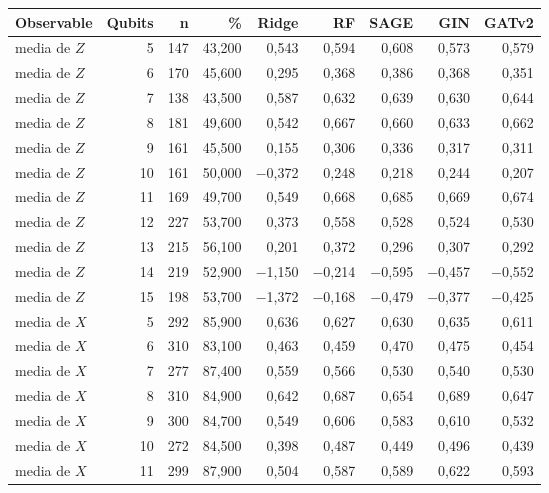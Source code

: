 \begin{table}[htbp]
    \centering
    {\footnotesize
    \begin{tabular}{@{}lrrrrrrrr@{}}
        \toprule
        \textbf{Observable} & \textbf{Qubits} & \textbf{n} & \textbf{\%} & \textbf{Ridge} & \textbf{RF} & \textbf{SAGE} & \textbf{GIN} & \textbf{GATv2} \\
        \midrule
        media de $Z$ & 5 & 147 & 43,200 & 0,543 & 0,594 & 0,608 & 0,573 & 0,579 \\
        media de $Z$ & 6 & 170 & 45,600 & 0,295 & 0,368 & 0,386 & 0,368 & 0,351 \\
        media de $Z$ & 7 & 138 & 43,500 & 0,587 & 0,632 & 0,639 & 0,630 & 0,644 \\
        media de $Z$ & 8 & 181 & 49,600 & 0,542 & 0,667 & 0,660 & 0,633 & 0,662 \\
        media de $Z$ & 9 & 161 & 45,500 & 0,155 & 0,306 & 0,336 & 0,317 & 0,311 \\
        media de $Z$ & 10 & 161 & 50,000 & $-$0,372 & 0,248 & 0,218 & 0,244 & 0,207 \\
        media de $Z$ & 11 & 169 & 49,700 & 0,549 & 0,668 & 0,685 & 0,669 & 0,674 \\
        media de $Z$ & 12 & 227 & 53,700 & 0,373 & 0,558 & 0,528 & 0,524 & 0,530 \\
        media de $Z$ & 13 & 215 & 56,100 & 0,201 & 0,372 & 0,296 & 0,307 & 0,292 \\
        media de $Z$ & 14 & 219 & 52,900 & $-$1,150 & $-$0,214 & $-$0,595 & $-$0,457 & $-$0,552 \\
        media de $Z$ & 15 & 198 & 53,700 & $-$1,372 & $-$0,168 & $-$0,479 & $-$0,377 & $-$0,425 \\
        media de $X$ & 5 & 292 & 85,900 & 0,636 & 0,627 & 0,630 & 0,635 & 0,611 \\
        media de $X$ & 6 & 310 & 83,100 & 0,463 & 0,459 & 0,470 & 0,475 & 0,454 \\
        media de $X$ & 7 & 277 & 87,400 & 0,559 & 0,566 & 0,530 & 0,540 & 0,530 \\
        media de $X$ & 8 & 310 & 84,900 & 0,642 & 0,687 & 0,654 & 0,689 & 0,647 \\
        media de $X$ & 9 & 300 & 84,700 & 0,549 & 0,606 & 0,583 & 0,610 & 0,532 \\
        media de $X$ & 10 & 272 & 84,500 & 0,398 & 0,487 & 0,449 & 0,496 & 0,439 \\
        media de $X$ & 11 & 299 & 87,900 & 0,504 & 0,587 & 0,589 & 0,622 & 0,593 \\

\end{tabular}}
\end{table}
